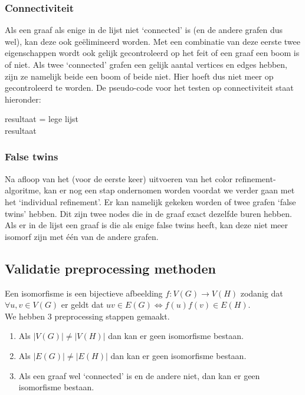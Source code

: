 \documentclass{article}
\begin{document}
\subsubsection{Connectiviteit}
Als een graaf als enige in de lijst niet ‘connected’ is (en de andere grafen dus wel), kan deze ook ge\"elimineerd worden. Met een combinatie van deze eerste twee eigenschappen wordt ook gelijk gecontroleerd op het feit of een graaf een boom is of niet. Als twee ‘connected’ grafen een gelijk aantal vertices en edges hebben, zijn ze namelijk beide een boom of beide niet. Hier hoeft dus niet meer op gecontroleerd te worden. De pseudo-code voor het testen op connectiviteit staat hieronder:\\

\begin{algorithm}[H]
	resultaat = lege lijst\\
	\Return resultaat
\end{algorithm}

\subsubsection{False twins}
Na afloop van het (voor de eerste keer) uitvoeren van het color refinement-algoritme, kan er nog een stap ondernomen worden voordat we verder gaan met het ‘individual refinement’. Er kan namelijk gekeken worden of twee grafen ‘false twins’ hebben. Dit zijn twee nodes die in de graaf exact dezelfde buren hebben. Als er in de lijst een graaf is die als enige false twins heeft, kan deze niet meer isomorf zijn met \'e\'en van de andere grafen.

\subsection{Validatie preprocessing methoden}

Een isomorfisme is een bijectieve afbeelding $f:V(G) \rightarrow V(H)$ zodanig dat $\forall u,v \in V(G)$ er geldt dat $uv \in E(G) \Leftrightarrow f(u)f(v)\in E(H)$.\\

We hebben 3 preprocessing stappen gemaakt.
\begin{enumerate}
\item Als $|V(G)|\neq|V(H)|$ dan kan er geen isomorfisme bestaan.
\item Als $|E(G)|\neq|E(H)|$ dan kan er geen isomorfisme bestaan.
\item Als een graaf wel `connected' is en de andere niet, dan kan er geen isomorfisme bestaan.
\end{enumerate}
\end{document}

